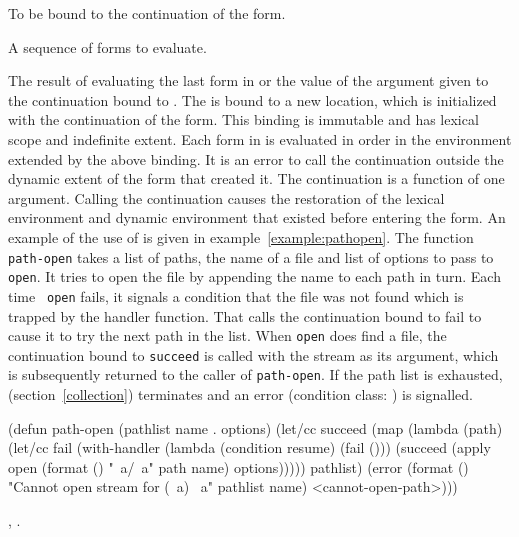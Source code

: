 \begin{optDefinition}

%
\Syntax
{}%
%
\begin{arguments}
    \item[\scref{identifier}] To be bound to the continuation of the
     form.
    \item[\scref{body}] A sequence of forms to evaluate.
\end{arguments}
%
\result%
The result of evaluating the last form in  or the value of
the argument given to the continuation bound to .
%
\remarks%
The  is bound to a new location, which is initialized with the
continuation of the  form.  This binding is immutable and has
lexical scope and indefinite extent.  Each form in  is evaluated in order
in the environment extended by the above binding.  It is an error to call the
continuation outside the dynamic extent of the  form that
created it.  The continuation is a function of one argument.  Calling the
continuation causes the restoration of the lexical environment and dynamic
environment that existed before entering the  form.
%
\examples%
An example of the use of  is given in
example~\ref{example:pathopen}.  The function {\tt path-open} takes a list of
paths, the name of a file and list of options to pass to {\tt open}.  It tries
to open the file by appending the name to each path in turn.  Each time {\tt
    open} fails, it signals a condition that the file was not found which is
trapped by the handler function.  That calls the continuation bound to fail to
cause it to try the next path in the list.  When {\tt open} does find a file,
the continuation bound to {\tt succeed} is called with the stream as its
argument, which is subsequently returned to the caller of {\tt path-open}.  If
the path list is exhausted,  (section~\ref{collection})
terminates and an error (condition class: ) is
signalled.
%
\begin{example}
\label{example:pathopen}
{\codeExample
(defun path-open (pathlist name . options)
  (let/cc succeed
    (map
      (lambda (path)
        (let/cc fail
          (with-handler
            (lambda (condition resume) (fail ()))
            (succeed
              (apply open
                (format () "~a/~a" path name)
                options)))))
      pathlist)
    (error
      (format ()
        "Cannot open stream for (~a) ~a"
        pathlist name)
      <cannot-open-path>)))
\endCodeExample}
\end{example}
%
\seealso%
, .


\end{optDefinition}
